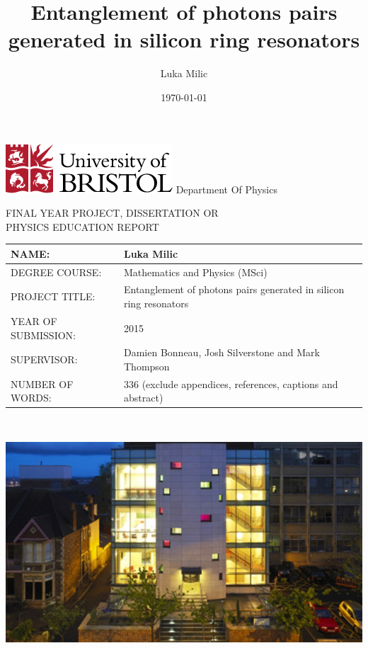 \documentclass[11pt]{article}
\title{Entanglement of photons pairs generated in silicon ring resonators}
\date{\today}
\author{Luka Milic}
\begin{document}
\begin{titlepage}
  \includegraphics[scale=0.6]{img/uob-logo.png}\hfill
  \LARGE Department Of Physics \\
  \begin{center}
    FINAL YEAR PROJECT, DISSERTATION OR\\
    PHYSICS EDUCATION REPORT
  \end{center} 

  \large
  {\renewcommand{\arraystretch}{2}%
  \begin{tabular}[t]{|l|p{10cm}|}
    \hline
    NAME: & Luka Milic \\ \hline
    DEGREE COURSE: & Mathematics and Physics (MSci)\\ \hline
    PROJECT TITLE: & Entanglement of photons pairs generated in silicon ring resonators \\ \hline
    YEAR OF SUBMISSION: & 2015\\ \hline
    SUPERVISOR: & Damien Bonneau, Josh Silverstone and Mark Thompson\\ \hline
    NUMBER OF WORDS: & 336 (exclude appendices, references, captions and abstract)\\ \hline
  \end{tabular} } \quad
  \\[1.5cm]
  \begin{center}
    \includegraphics[scale=0.7]{img/nsqi.jpg}
  \end{center}
\end{titlepage}
\newpage
\maketitle
\end{document}
